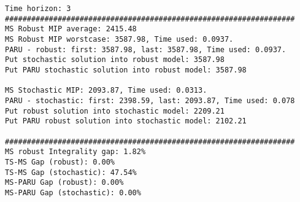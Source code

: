 \documentclass[10pt]{article}
\theoremstyle{plain}
\theoremstyle{definition}
\theoremstyle{remark}
\begin{document}
\noindent
\begin{minipage}[t]{8cm}
\tiny
\begin{verbatim}
Time horizon: 3
##################################################################
MS Robust MIP average: 2415.48
MS Robust MIP worstcase: 3587.98, Time used: 0.0937.
PARU - robust: first: 3587.98, last: 3587.98, Time used: 0.0937.
Put stochastic solution into robust model: 3587.98
Put PARU stochastic solution into robust model: 3587.98

MS Stochastic MIP: 2093.87, Time used: 0.0313.
PARU - stochastic: first: 2398.59, last: 2093.87, Time used: 0.078
Put robust solution into stochastic model: 2209.21
Put PARU robust solution into stochastic model: 2102.21

##################################################################
MS robust Integrality gap: 1.82%
TS-MS Gap (robust): 0.00%
TS-MS Gap (stochastic): 47.54%
MS-PARU Gap (robust): 0.00%
MS-PARU Gap (stochastic): 0.00%


\end{verbatim}
\end{minipage}
\end{document}
